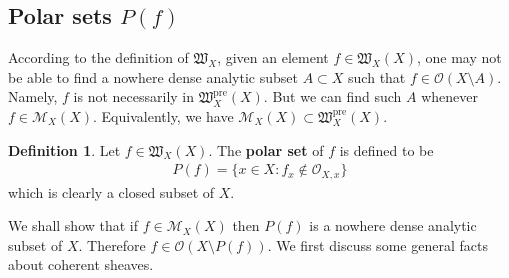 \documentclass[12pt,b5paper,notitlepage]{report}
\theoremstyle{definition}
\newtheorem{df}{Definition}[section]
\theoremstyle{plain}
\DeclareMathOperator{\sann}{\mathscr{A}\text{\kern -3pt {\calligra\large nn}}\,}
\newcommand{\fk}{\mathfrak}
\newcommand{\scr}{\mathscr}
\newcommand{\Ann}{\mathrm{Ann}}
\newcommand{\Supp}{\mathrm{Supp}}
\newcommand{\pre}{\mathrm{pre}}
\numberwithin{equation}{section}
\begin{document}
\subsection{Polar sets $P(f)$}



According to the definition of $\fk W_X$, given an element  $f\in\fk W_X(X)$, one may not be able to find a nowhere dense analytic subset $A\subset X$ such that $f\in\scr O(X\setminus A)$. Namely, $f$ is not necessarily in $\fk W_X^\pre(X)$. But we can find such $A$ whenever $f\in\scr M_X(X)$. Equivalently, we have $\scr M_X(X)\subset\fk W_X^\pre(X)$.

\begin{df}
Let $f\in\fk W_X(X)$. The \textbf{polar set} of $f$  is defined to be
\begin{align}
P(f)=\{x\in X:f_x\notin\scr O_{X,x}\}
\end{align}
which is clearly a closed subset of $X$.
\end{df}


We shall show that if $f\in\scr M_X(X)$ then $P(f)$ is a nowhere dense analytic subset of $X$. Therefore $f\in\scr O(X\setminus P(f))$. We first discuss some general facts about coherent sheaves.


\end{document}
